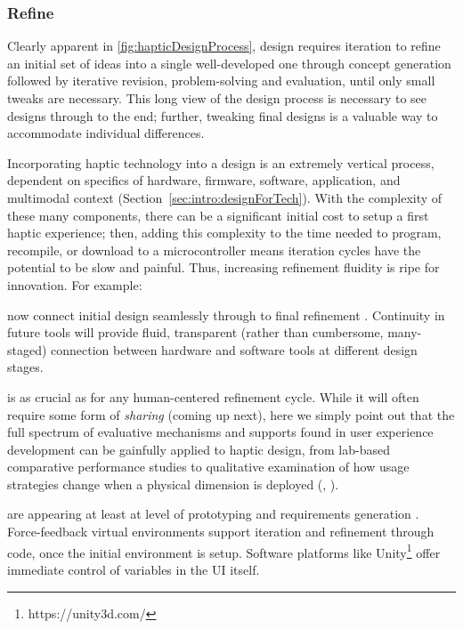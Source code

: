 \subsubsection{Refine}
	\label{sec:make_DP_refine}
Clearly apparent in \autoref{fig:hapticDesignProcess}, design requires iteration to refine an initial set of ideas into a single well-developed one through concept generation followed by iterative revision, problem-solving and  evaluation, until only small tweaks are necessary.
This long view of the design process is necessary to see designs through to the end;
further, tweaking final designs is a valuable way to accommodate individual differences.

Incorporating haptic technology into a design is an extremely vertical process,  dependent on  specifics of hardware, firmware, software, application, and multimodal context (Section~\ref{sec:intro:designForTech}).
With the complexity of these many components, there can be a significant initial cost to setup a first haptic experience; then, adding this complexity to the time needed to program, recompile, or download to a microcontroller means iteration cycles have the potential to be slow and painful. 
%
Thus, increasing refinement fluidity is ripe for innovation. For example:

 now connect initial design seamlessly through to final refinement \cite{schneider2015tactile,Schneider2016macaron}.
Continuity in future tools will provide fluid, transparent (rather than cumbersome, many-staged) connection between hardware and software tools at different design stages.

 is as crucial as for any human-centered refinement cycle. While it will often require some form of \textit{sharing} (coming up next), here we simply point out that the full spectrum of evaluative mechanisms and supports found in user experience development can be gainfully applied to haptic design, from lab-based comparative performance studies to qualitative examination of how usage strategies change when a physical dimension is deployed (\eg, \cite{minaker:2016:EH:handson}).

 are appearing at least at level of prototyping and requirements generation \cite{SchneiderAsiaHaptics2014,Seifi2014}. 
Force-feedback virtual environments support iteration and refinement through code, once the initial environment is setup.
Software platforms like Unity\footnote{https://unity3d.com/} offer immediate control of variables in the UI itself.

